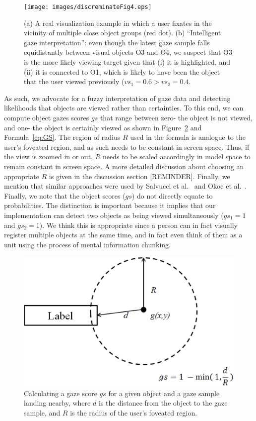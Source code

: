 \begin{figure}[htb]
  \centering
  \texttt{[image: images/discreminateFig4.eps]}
  \caption{(a) A real visualization example in which a user fixates in the vicinity of multiple close object groups (red dot). (b) ``Intelligent gaze interpretation'': even though the latest gaze sample falls equidistantly between visual objects O3 and O4, we suspect that O3 is the more likely viewing target given that (i) it is highlighted, and (ii) it is connected to O1, which is likely to have been the object that the user viewed previously ($vs_1=0.6 > vs_2 = 0.4$. }
	\label{fig:discreminateFig4}
\end{figure}

As such, we advocate for a fuzzy interpretation of gaze data and detecting likelihoods that objects are viewed rather than certainties. To this end, we can compute object gazes scores $gs$ that range between zero- the object is not viewed, and one- the object is certainly viewed as shown in Figure~\ref{fig:gazeScoreFig3} and Formula~\ref{eq:GS}. The region of radius $R$ used in the formula is analogue to the user's foveated region, and as such needs to be constant in screen space. Thus, if the view is zoomed in or out, $R$ needs to be scaled accordingly in model space to remain constant in screen space.  A more detailed discussion about choosing an appropriate $R$ is given in the discussion section [REMINDER]. Finally, we mention that similar approaches were used by Salvucci et al.~\cite{salvucci2000intelligent} and Okoe et al.~\cite{okoe2014gaze}.
Finally, we note that the object scores ($gs$) do not directly equate to probabilities. The distinction is important because it implies that our implementation can detect two objects as being viewed simultaneously ($gs_1 = 1$ and $gs_2=1$). We think this is appropriate since a person can in fact visually register multiple objects at the same time, and in fact even think of them as a unit using the process of mental information chunking.
\begin{figure}[htb]
  \centering
  \includegraphics[width=\linewidth]{images/gazeScoreFig3.eps}
  \caption{Calculating a gaze score $gs$ for a given object and a gaze sample landing nearby, where $d$ is the distance from the object to the gaze sample, and $R$ is the radius of the user’s foveated region. }
	\label{fig:gazeScoreFig3}
\end{figure}

